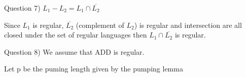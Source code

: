 \documentclass{article}
\begin{document}

\newpage
Question 7)
$L_1 - L_2 = L_1 \cap \overline{L_2}$

Since $L_1$ is regular, $\overline{L_2}$ (complement of $L_2$) is regular and intersection are all closed under the set of regular languages then $L_1 \cap \overline{L_2}$ is regular.


\vspace{8cm}
Question 8)
We assume that ADD is regular.

Let p be the puming length given by the pumping lemma
\end{document}
